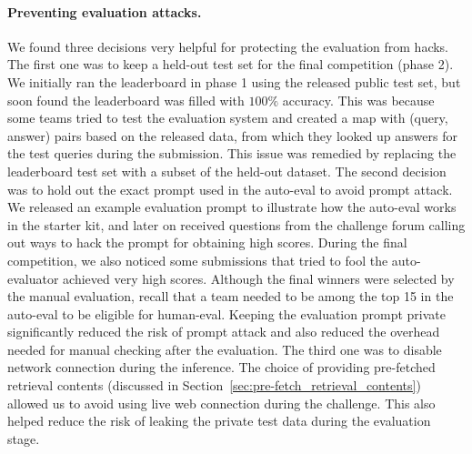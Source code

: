 \paragraph{Preventing evaluation attacks.}
We found three decisions very helpful for protecting the evaluation from hacks. The first one was to keep a held-out test set for the final competition (phase 2). We initially ran the leaderboard in phase 1 using the released public test set, but soon found the leaderboard was filled with $100\%$ accuracy. This was because some teams tried to test the evaluation system and created a map with (query, answer) pairs based on the released data, from which they looked up answers for the test queries during the submission. This issue was remedied by replacing the leaderboard test set with a subset of the held-out dataset. The second decision was to hold out the exact prompt used in the auto-eval to avoid prompt attack. We released an example evaluation prompt to illustrate how the auto-eval works in the starter kit, and later on received questions from the challenge forum calling out ways to hack the prompt for obtaining high scores. During the final competition, we also noticed some submissions that tried to fool the auto-evaluator achieved very high scores. Although the final winners were selected by the manual evaluation, recall that a team needed to be among the top 15 in the auto-eval to be eligible for human-eval. Keeping the evaluation prompt private significantly reduced the risk of prompt attack and also reduced the overhead needed for manual checking after the evaluation. The third one was to disable network connection during the inference. The choice of providing pre-fetched retrieval contents (discussed in Section~\ref{sec:pre-fetch_retrieval_contents}) allowed us to avoid using live web connection during the challenge. This also helped reduce the risk of leaking the private test data during the evaluation stage. 




